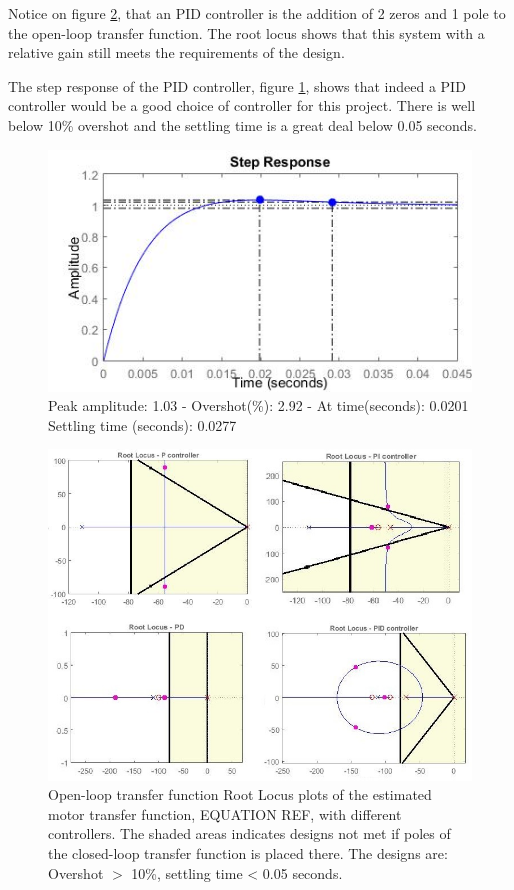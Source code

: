 Notice on figure \ref{fig:RlocusControllers}, that an PID controller is the addition of 2 zeros and 1 pole to the open-loop transfer function. The root locus shows that this system with a relative gain still meets the requirements of the design.\par

The step response of the PID controller, figure \ref{fig:PIDStep}, shows that indeed a PID controller would be a good choice of controller for this project. There is well below 10\% overshot and the settling time is a great deal below 0.05 seconds.

\begin{figure}[h!]
\centering
\includegraphics[scale=0.7]{Billeder/PIDStep.jpg}
\caption{ Peak amplitude: 1.03 - Overshot(\%): 2.92 - At time(seconds): 0.0201
		 Settling time (seconds): 0.0277 }
\label{fig:PIDStep}
\end{figure}

\begin{figure}[h!]
\centering
\includegraphics[scale=0.7]{Billeder/RlocusControllers.jpg}
\caption{ Open-loop transfer function Root Locus plots of the estimated motor transfer function, EQUATION REF, with different controllers. The shaded areas indicates designs not met if poles of the closed-loop transfer function is placed there. 
The designs are: Overshot $>$ 10\%, settling time < 0.05 seconds. }
\label{fig:RlocusControllers}
\end{figure}


